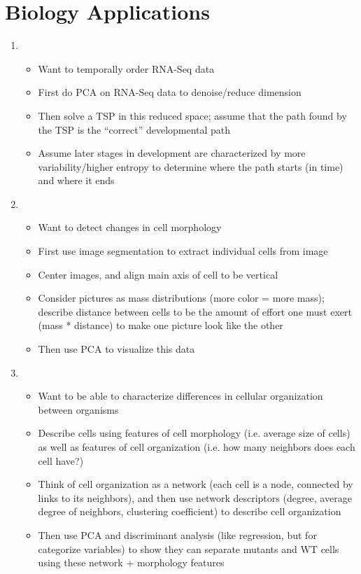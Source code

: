 \documentclass[12pt]{article}
\begin{document}
\section{Biology Applications}

\begin{enumerate}


\item {}
\begin{itemize}
	\item Want to temporally order RNA-Seq data
	\item First do PCA on RNA-Seq data to denoise/reduce dimension
	\item Then solve a TSP in this reduced space; assume that the path found by the TSP is the ``correct'' developmental path
	\item Assume later stages in development are characterized by more variability/higher entropy to determine where the path starts (in time) and where it ends
\end{itemize}

\item {}
\begin{itemize}
	\item Want to detect changes in cell morphology
	\item First use image segmentation to extract individual cells from image
	\item Center images, and align main axis of cell to be vertical
	\item Consider pictures as mass distributions (more color = more mass); describe distance between cells to be the amount of effort one must exert (mass * distance) to make one picture look like the other
	\item Then use PCA to visualize this data
\end{itemize}

\item {}
\begin{itemize}
	\item Want to be able to characterize differences in cellular organization between organisms
	\item Describe cells using features of cell morphology (i.e. average size of cells) as well as features of cell organization (i.e. how many neighbors does each cell have?)
	\item Think of cell organization as a network (each cell is a node, connected by links to its neighbors), and then use network descriptors (degree, average degree of neighbors, clustering coefficient) to describe cell organization
	\item Then use PCA and discriminant analysis (like regression, but for categorize variables) to show they can separate mutants and WT cells using these network + morphology features
\end{itemize}


\end{enumerate}
\end{document}
